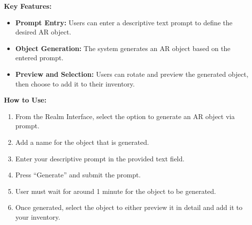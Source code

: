 \documentclass[12pt, titlepage]{article}
\begin{document}
\textbf{Key Features:}
\begin{itemize}[leftmargin=*]
    \item \textbf{Prompt Entry:} Users can enter a descriptive text prompt to define the desired AR object.
    \item \textbf{Object Generation:} The system generates an AR object based on the entered prompt.
    \item \textbf{Preview and Selection:} Users can rotate and preview the generated object, then choose to add it to their inventory.
\end{itemize}

\textbf{How to Use:}
\begin{enumerate}[leftmargin=*]
    \item From the Realm Interface, select the option to generate an AR object via prompt.
    \item Add a name for the object that is generated.
    \item Enter your descriptive prompt in the provided text field.
    \item Press ``Generate'' and submit the prompt.
    \item User must wait for around 1 minute for the object to be generated.
    \item Once generated, select the object to either preview it in detail and add it to your inventory.
\end{enumerate}
\end{document}
